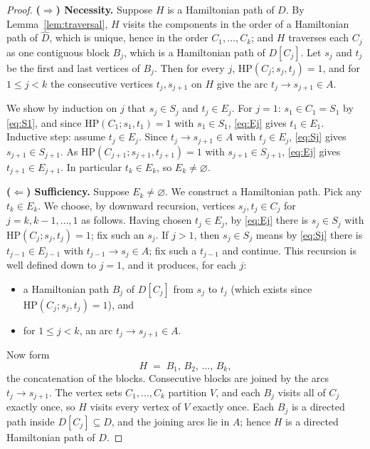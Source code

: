 \documentclass[12pt]{article}
\theoremstyle{definition}
\newcommand{\Vv}{V}
\newcommand{\Aa}{A}
\begin{document}
\begin{proof}
\textbf{($\Rightarrow$) Necessity.}
Suppose $H$ is a Hamiltonian path of $D$. By Lemma~\ref{lem:traversal}, $H$ visits
the components in the order of a Hamiltonian path of $\widehat D$, which is unique,
hence in the order $C_{1},\dots,C_{k}$; and $H$ traverses each $C_{j}$ as one
contiguous block $B_{j}$, which is a Hamiltonian path of $D[C_{j}]$. Let $s_{j}$
and $t_{j}$ be the first and last vertices of $B_{j}$. Then for every $j$,
$\mathrm{HP}(C_{j};s_{j},t_{j})=1$, and for $1\le j<k$ the consecutive vertices
$t_{j},s_{j+1}$ on $H$ give the arc $t_{j}\to s_{j+1}\in\Aa$.

We show by induction on $j$ that $s_{j}\in S_{j}$ and $t_{j}\in E_{j}$. For $j=1$:
$s_{1}\in C_{1}=S_{1}$ by \eqref{eq:S1}, and since
$\mathrm{HP}(C_{1};s_{1},t_{1})=1$ with $s_{1}\in S_{1}$, \eqref{eq:Ej} gives
$t_{1}\in E_{1}$. Inductive step: assume $t_{j}\in E_{j}$. Since
$t_{j}\to s_{j+1}\in\Aa$ with $t_{j}\in E_{j}$, \eqref{eq:Sj} gives
$s_{j+1}\in S_{j+1}$. As $\mathrm{HP}(C_{j+1};s_{j+1},t_{j+1})=1$ with
$s_{j+1}\in S_{j+1}$, \eqref{eq:Ej} gives $t_{j+1}\in E_{j+1}$. In particular
$t_{k}\in E_{k}$, so $E_{k}\neq\varnothing$.

\textbf{($\Leftarrow$) Sufficiency.}
Suppose $E_{k}\neq\varnothing$. We construct a Hamiltonian path. Pick any
$t_{k}\in E_{k}$. We choose, by downward recursion, vertices $s_{j},t_{j}\in C_{j}$
for $j=k,k-1,\dots,1$ as follows. Having chosen $t_{j}\in E_{j}$, by
\eqref{eq:Ej} there is $s_{j}\in S_{j}$ with $\mathrm{HP}(C_{j};s_{j},t_{j})=1$;
fix such an $s_{j}$. If $j>1$, then $s_{j}\in S_{j}$ means by \eqref{eq:Sj} there
is $t_{j-1}\in E_{j-1}$ with $t_{j-1}\to s_{j}\in\Aa$; fix such a $t_{j-1}$ and
continue. This recursion is well defined down to $j=1$, and it produces, for each
$j$:
\begin{itemize}
\item a Hamiltonian path $B_{j}$ of $D[C_{j}]$ from $s_{j}$ to $t_{j}$
(which exists since $\mathrm{HP}(C_{j};s_{j},t_{j})=1$), and
\item for $1\le j<k$, an arc $t_{j}\to s_{j+1}\in\Aa$.
\end{itemize}
Now form
\[
H \;=\; B_{1},\,B_{2},\,\dots,\,B_{k},
\]
the concatenation of the blocks. Consecutive blocks are joined by the arcs
$t_{j}\to s_{j+1}$. The vertex sets $C_{1},\dots,C_{k}$ partition $\Vv$, and each
$B_{j}$ visits all of $C_{j}$ exactly once, so $H$ visits every vertex of $\Vv$
exactly once. Each $B_{j}$ is a directed path inside $D[C_{j}]\subseteq D$, and the
joining arcs lie in $\Aa$; hence $H$ is a directed Hamiltonian path of $D$.
\end{proof}
\end{document}
